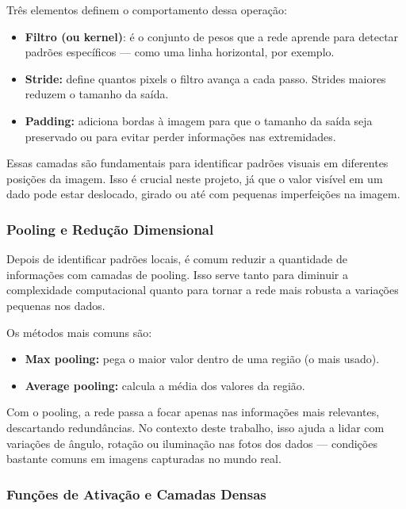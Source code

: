 Três elementos definem o comportamento dessa operação:

\begin{itemize}
    \item \textbf{Filtro (ou kernel)}: é o conjunto de pesos que a rede aprende para detectar padrões específicos — como uma linha horizontal, 
    por exemplo.
    \item \textbf{Stride:} define quantos pixels o filtro avança a cada passo. Strides maiores reduzem o tamanho da saída.
    \item \textbf{Padding:} adiciona bordas à imagem para que o tamanho da saída seja preservado ou para evitar perder informações nas 
    extremidades.
\end{itemize}

Essas camadas são fundamentais para identificar padrões visuais em diferentes posições da imagem. Isso é crucial neste projeto, já que o 
valor visível em um dado pode estar deslocado, girado ou até com pequenas imperfeições na imagem. \cite{lecun1998gradient, datacamp_cnn}

\subsubsection{Pooling e Redução Dimensional}

Depois de identificar padrões locais, é comum reduzir a quantidade de informações com camadas de pooling. Isso serve tanto para diminuir a 
complexidade computacional quanto para tornar a rede mais robusta a variações pequenas nos dados.

Os métodos mais comuns são:

\begin{itemize}
    \item \textbf{Max pooling:} pega o maior valor dentro de uma região (o mais usado).
    \item \textbf{Average pooling:} calcula a média dos valores da região.
\end{itemize}

Com o pooling, a rede passa a focar apenas nas informações mais relevantes, descartando redundâncias. No contexto deste trabalho, isso ajuda 
a lidar com variações de ângulo, rotação ou iluminação nas fotos dos dados — condições bastante comuns em imagens capturadas no mundo real.

\subsubsection{Funções de Ativação e Camadas Densas}

